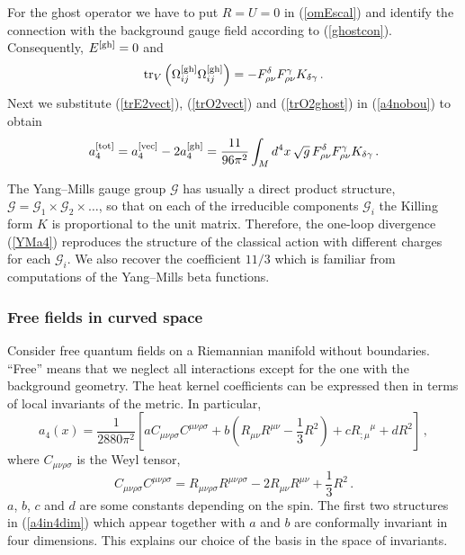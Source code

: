 For the ghost operator we have to put $R=U=0$ in (\ref{omEscal})
and identify the connection with the background gauge field
according to (\ref{ghostcon}). Consequently, $E^{[{\rm gh}]}=0$ and
\begin{equation}
{\rm tr}_V \left( \Omega_{ij}^{[{\rm gh}]} \Omega_{ij}^{[{\rm gh}]} \right)=
-F_{\rho\nu}^\delta F_{\rho\nu}^\gamma K_{\delta\gamma} \,.\label{trO2ghost}
\end{equation}
Next we substitute (\ref{trE2vect}), (\ref{trO2vect}) and 
(\ref{trO2ghost}) in (\ref{a4nobou}) to obtain
\begin{equation}
a_4^{[{\rm tot}]}=a_4^{[{\rm vec}]}-2a_4^{[{\rm gh}]}=
\frac{11}{96\pi^2} \int_M d^4x\, \sqrt{g}\, 
F_{\rho\nu}^\delta F_{\rho\nu}^\gamma K_{\delta\gamma}\,.
\label{YMa4}
\end{equation}

The Yang--Mills gauge group $\mathcal{G}$ has usually a direct product
structure, $\mathcal{G}=\mathcal{G}_1\times \mathcal{G}_2 \times\dots$,
so that on each of the irreducible components $\mathcal{G}_i$ the Killing
form $K$ is proportional to the unit matrix. Therefore, the one-loop
divergence (\ref{YMa4}) reproduces the structure of the classical action
with different charges for each $\mathcal{G}_i$. We also recover the
coefficient $11/3$ which is familiar from computations of
the Yang--Mills beta functions.
\subsubsection{Free fields in curved space}\label{s4free}
Consider free quantum fields on a Riemannian manifold without boundaries.
``Free'' means that we neglect all interactions except for the one
with the background geometry. The heat kernel coefficients can be
expressed then in terms of local invariants of the metric.
In particular,
\begin{equation}
a_4(x)=\frac 1{2880\pi^2} \left[
aC_{\mu\nu\rho\sigma}C^{\mu\nu\rho\sigma} +b\left( R_{\mu\nu}R^{\mu\nu}
-\frac 13 R^2 \right) +c {R_{;\mu}}^\mu +d R^2 \right]\,,
\label{a4in4dim}
\end{equation} 
where $C_{\mu\nu\rho\sigma}$ is the Weyl tensor,
\begin{equation}
C_{\mu\nu\rho\sigma}C^{\mu\nu\rho\sigma}=R_{\mu\nu\rho\sigma}
R^{\mu\nu\rho\sigma} - 2R_{\mu\nu}R^{\mu\nu} +\frac 13 R^2 \,.
\label{Weylsquare}
\end{equation}
$a$, $b$, $c$ and $d$ are some constants depending on the spin.
The first two structures in (\ref{a4in4dim}) which appear together
with $a$ and $b$ are conformally invariant in four dimensions.
This explains our choice of the basis in the space of invariants.

